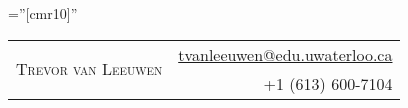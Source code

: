 \documentclass[a4paper,10pt]{article}
\begin{document}
\pagestyle{empty} %

\font\fb=''[cmr10]'' %

\par{
    \begin{tabular}{lr}

        \multirow{2}{12.9cm}{\Huge{\textsc{Trevor van Leeuwen}}} & \href{mailto:tvanleeuwen@edu.uwaterloo.ca}{tvanleeuwen@edu.uwaterloo.ca} \\
         & +1 (613) 600-7104
    \end{tabular}
\bigskip\par}


\end{document}
